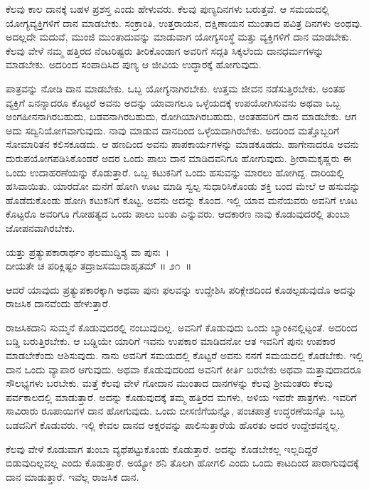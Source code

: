 ಕೆಲವು ಕಾಲ ದಾನಕ್ಕೆ ಬಹಳ ಪ್ರಶಸ್ತ ಎಂದು ಹೇಳುವರು. ಕೆಲವು ಪುಣ್ಯದಿನಗಳು ಬರುತ್ತವೆ. ಆ ಸಮಯದಲ್ಲಿ ಯೋಗ್ಯವ್ಯಕ್ತಿಗಳಿಗೆ ದಾನ ಮಾಡಬೇಕು. ಸಂಕ್ರಾಂತಿ, ಉತ್ತರಾಯನ, ದಕ್ಷಿಣಾಯನ ಮುಂತಾದ ಪವಿತ್ರ ದಿನಗಳು ಅಂಥವು. ಅದಲ್ಲದೇ ಮದುವೆ, ಮುಂಜಿ ಮುಂತಾದುವನ್ನು ಮಾಡುವಾಗ ಯೋಗ್ಯಸಂಸ್ಥೆ ಮತ್ತು ವ್ಯಕ್ತಿಗಳಿಗೆ ದಾನ ಮಾಡಬೇಕು. ಕೆಲವು ವೇಳೆ ನಮ್ಮ ಹತ್ತಿರದ ನೆಂಟರಿಷ್ಟರು ತೀರಿಕೊಂಡಾಗ ಅವರಿಗೆ ಸದ್ಗತಿ ಸಿಕ್ಕಲೆಂದು ದಾನಧರ್ಮಗಳನ್ನು ಮಾಡಬೇಕು. ಅದರಿಂದ ಸಂಪಾದಿಸಿದ ಪುಣ್ಯ ಆ ಜೀವಿಯ ಉದ್ಧಾರಕ್ಕೆ ಹೋಗುವುದು.

ಪಾತ್ರವನ್ನು ನೋಡಿ ದಾನ ಮಾಡಬೇಕು. ಒಬ್ಬ ಯೋಗ್ಯನಾಗಿರಬೇಕು. ಉತ್ತಮ ಜೀವನ ನಡೆಸುತ್ತಿರಬೇಕು. ಅಂತಹ ವ್ಯಕ್ತಿಗೆ ಏನನ್ನಾದರೂ ಕೊಟ್ಟರೆ ಅವನು ಅದನ್ನು ಯಾವಾಗಲೂ ಒಳ್ಳೆಯದಕ್ಕೆ ಉಪಯೋಗಿಸುವನು ಅಥವಾ ಒಬ್ಬ ಅಂಗಹೀನನಾಗಿರಬಹುದು, ಬಡವನಾಗಿರಬಹುದು, ರೋಗಿಯಾಗಿರಬಹುದು, ಅಂತಹವರಿಗೆ ದಾನ ಮಾಡಬೇಕು. ಆಗ ಅದು ಸದ್ವಿನಿ\-ಯೋಗವಾಗುವುದು. ನಾವು ಮಾಡುವ ದಾನದಿಂದ ಒಳ್ಳೆಯದಾಗಿರಬೇಕು. ಅದರಿಂದ ಮತ್ತೊಬ್ಬರಿಗೆ ಸೋಮಾರಿತನ ಕಲಿಸಕೂಡದು. ಆ ಹಣದಿಂದ ಅವನು ಪಾಪಕಾರ್ಯಗಳನ್ನು ಮಾಡಕೂಡದು. ಹಾಗೇನಾದರೂ ಅವನು ದುರುಪಯೋಗಪಡಿಸಿಕೊಂಡರೆ ಅದರ ಒಂದು ಪಾಲು ದಾನ ಮಾಡಿದವನಿಗೂ ಹೋಗುವುದು. ಶ‍್ರೀರಾಮಕೃಷ್ಣರು ಈ ಒಂದು ಉದಾಹರಣೆಯನ್ನು ಕೊಡುತ್ತಾರೆ. ಒಬ್ಬ ಕಟುಕನಿಗೆ ಒಂದು ಹಸುವನ್ನು ಮಾರಲು ಹೋಗಿದ್ದ. ದಾರಿಯಲ್ಲಿ ಹಸಿವಾಯಿತು. ಯಾರದೋ ಮನೆಗೆ ಹೋಗಿ ಊಟ ಮಾಡಿ ಸ್ವಲ್ಪ ಸುಧಾರಿಸಿಕೊಂಡು ಶಕ್ತಿ ಬಂದ ಮೇಲೆ ಆ ಹಸುವನ್ನು ಹೊಡೆದುಕೊಂಡು ಹೋಗಿ ಕಟುಕನಿಗೆ ಕೊಟ್ಟ. ಅವನು ಅದನ್ನು ಕೊಂದ. ಇಲ್ಲಿ ಯಾವ ಮನೆಯವರು ಅವನಿಗೆ ಊಟ ಕೊಟ್ಟರೊ ಅವರಿಗೂ ಗೋಹತ್ಯದ ಒಂದು ಪಾಲು ಬಂತು ಎನ್ನುವರು. ಆದಕಾರಣ ನಾವು ಕೊಡುವುದರಲ್ಲಿ ತುಂಬಾ ಜೋಪನವಾಗಿರಬೇಕು.

\begin{shloka}
ಯತ್ತು ಪ್ರತ್ಯುಪಕಾರಾರ್ಥಂ ಫಲಮುದ್ದಿಶ್ಯ ವಾ ಪುನಃ~।\\ದೀಯತೇ ಚ ಪರಿಕ್ಲಿಷ್ಟಂ ತದ್ರಾಜಸಮುದಾಹೃತಮ್ \hfill॥ ೨೧~॥
\end{shloka}

\begin{artha}
ಆದರೆ ಯಾವುದು ಪ್ರತ್ಯುಪಕಾರಕ್ಕಾಗಿ ಅಥವಾ ಪುನಃ ಫಲವನ್ನು ಉದ್ದೇಶಿಸಿ ಪರಿಕ್ಲೇಶದಿಂದ ಕೊಡಲ್ಪಡುವುದೊ ಅದನ್ನು ರಾಜಸಿಕ ದಾನವೆಂದು ಹೇಳುತ್ತಾರೆ.
\end{artha}

ರಾಜಸಿಕದಾನಿ ಸುಮ್ಮನೆ ಕೊಡುವುದರಲ್ಲಿ ನಂಬುವುದಿಲ್ಲ. ಅವನಿಗೆ ಕೊಡುವುದು ಒಂದು ಬ್ಯಾಂಕಿನಲ್ಲಿಟ್ಟಂತೆ. ಅದರಿಂದ ಬಡ್ಡಿ ಬರುತ್ತಿರಬೇಕು. ಆ ಬಡ್ಡಿಯೇ ಯಾರಿಗೆ ಇವನು ಉಪಕಾರ ಮಾಡಿದನೋ ಆತ ಇವನಿಗೆ ಪುನಃ ಉಪಕಾರ ಮಾಡಬೇಕೆಂದು ಆಶಿಸುವುದು. ನಾನು ಅವನಿಗೆ ಸಮಯದಲ್ಲಿ ಕೊಟ್ಟರೆ ಅವನು ನನಗೆ ಸಮಯದಲ್ಲಿ ಕೊಡಬೇಕು. ಇಲ್ಲಿ ದಾನ ಒಂದು ವ್ಯಾಪಾರ ಆಗುವುದು. ಅಥವಾ ಕೊಡುವುದರಿಂದ ಅವನಿಗೆ ಕೀರ್ತಿ ಬರಬೇಕು ಅಥವಾ ಮತ್ತಾವುದಾದರೂ ಸೌಲಭ್ಯಗಳು ಬರಬೇಕು. ಮತ್ತೆ ಕೆಲವು ವೇಳೆ ಗೋದಾನ ಮುಂತಾದ ದಾನಗಳನ್ನು ಕೆಲವು ಶ‍್ರೀಮಂತರು ಕೆಲವು ಪರ್ವಕಾಲದಲ್ಲಿ ಮಾಡುತ್ತಾರೆ. ಅದನ್ನು ಕೊಡುವುದಕ್ಕೆ ತಮ್ಮ ಹತ್ತಿರದ ಮಗಳು, ಅಳಿಯ ಇವರೇ ಪಾತ್ರಗಳು. ಇವರಿಗೆ ಸಾವಿರಾರು ರೂಪಾಯಿಗಳ ದಾನ ಹೋಗುವುದು. ಒಂದು ಬೀಸಣಿಗೆಯನ್ನೊ, ಪಂಚಪಾತ್ರೆ ಉದ್ಧರಣೆಯನ್ನೊ ಒಬ್ಬ ಬಡವನಿಗೆ ಕೊಡುವರು. ಇಲ್ಲಿ ಕೇವಲ ದಾನದ ಅಕ್ಷರವನ್ನು ಪಾಲಿಸುತ್ತಾರೆಯೆ ಹೊರತು ಅದರ ಉದ್ದೇಶವನ್ನಲ್ಲ.

ಕೆಲವು ವೇಳೆ ಕೊಡುವಾಗ ತುಂಬಾ ವ್ಯಥೆಪಟ್ಟುಕೊಂಡು ಕೊಡುತ್ತಾರೆ. ಅದನ್ನು ಕೊಡಬೇಕಲ್ಲ ಇಲ್ಲದಿದ್ದರೆ ಬಿಡುವುದಿಲ್ಲವಲ್ಲ ಎಂದು ಕೊಡುತ್ತಾರೆ. ಅಯ್ಯೋ ಶನಿ ತೊಲಗಿ ಹೋಗಲಿ ಎಂದು ಒಂದು ಕಾಟದಿಂದ ಪಾರಾಗುವುದಕ್ಕೆ ದಾನ ಮಾಡುತ್ತಾರೆ. ಇವೆಲ್ಲ ರಾಜಸಿಕ ದಾನ.

